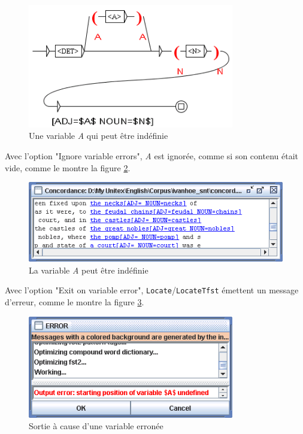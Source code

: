 \bigskip
\begin{figure}[!h]
\begin{center}
\includegraphics[width=9cm]{resources/img/fig6-advanced-options5.png}
\caption{Une variable \textit{A} qui peut être indéfinie
\label{fig6-advanced-options5}}
\end{center}
\end{figure}

\noindent Avec l'option "Ignore variable errors", \textit{A} est ignorée, comme si son contenu était
vide, comme le montre la figure
\ref{fig6-advanced-options6}. 

\bigskip
\begin{figure}[!h]
\begin{center}
\includegraphics[width=12cm]{resources/img/fig6-advanced-options6.png}
\caption{La variable \textit{A} peut être indéfinie
\label{fig6-advanced-options6}}
\end{center}
\end{figure}


\noindent Avec l'option "Exit on variable error", \verb+Locate+/\verb+LocateTfst+
émettent un message d'erreur, comme le montre la figure
\ref{fig6-advanced-options7}.

\bigskip
\begin{figure}[!h]
\begin{center}
\includegraphics[width=9cm]{resources/img/fig6-advanced-options7.png}
\caption{Sortie à cause d'une variable erronée\label{fig6-advanced-options7}}
\end{center}
\end{figure}

